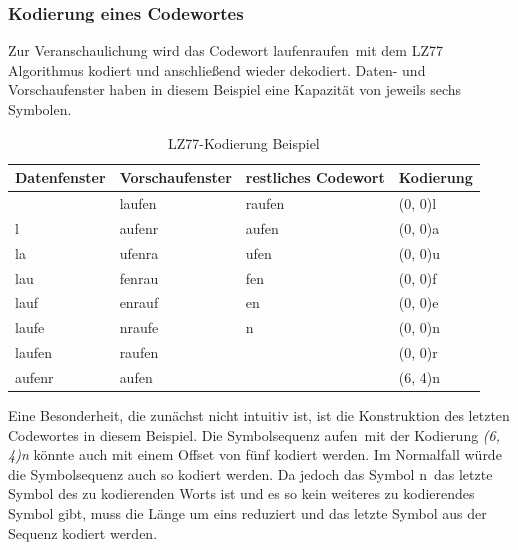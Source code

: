 \subsubsection{Kodierung eines Codewortes}
\label{subsubsec:kodierung_codewort}
Zur Veranschaulichung wird das Codewort \glqq laufenraufen\grqq\ mit dem LZ77 Algorithmus kodiert und anschließend wieder dekodiert.
Daten- und Vorschaufenster haben in diesem Beispiel eine Kapazität von jeweils sechs Symbolen. \newpage
\begin{table}[H]
\centering
\begin{tabular}{|l|l|l|l|}
\hline
\textbf{Datenfenster} & \textbf{Vorschaufenster} & \textbf{restliches Codewort} & \textbf{Kodierung} \\ \hline
                      & laufen                   & raufen                       & (0, 0)l            \\ \hline
l                     & aufenr                   & aufen                        & (0, 0)a            \\ \hline
la                    & ufenra                   & ufen                         & (0, 0)u            \\ \hline
lau                   & fenrau                   & fen                          & (0, 0)f            \\ \hline
lauf                  & enrauf                   & en                           & (0, 0)e            \\ \hline
laufe                 & nraufe                   & n                            & (0, 0)n            \\ \hline
laufen                & raufen                   &                              & (0, 0)r            \\ \hline
aufenr                & aufen                    &                              & (6, 4)n            \\ \hline
\end{tabular}
\label{tab:lz77_encode_table}
\caption{LZ77-Kodierung Beispiel}
\end{table}

Eine Besonderheit, die zunächst nicht intuitiv ist, ist die Konstruktion des letzten Codewortes in diesem Beispiel.
Die Symbolsequenz \glqq aufen\grqq\ mit der Kodierung \textit{(6, 4)n} könnte auch mit einem Offset von fünf kodiert werden.
Im Normalfall würde die Symbolsequenz auch so kodiert werden.
Da jedoch das Symbol \glqq n\grqq\ das letzte Symbol des zu kodierenden Worts ist und es so kein weiteres zu kodierendes Symbol gibt, muss die Länge um eins reduziert und das letzte Symbol aus der Sequenz kodiert werden. \newline

